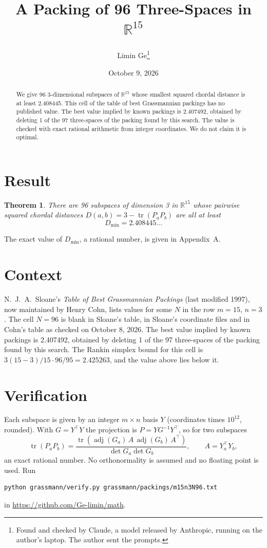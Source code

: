 \documentclass[11pt,a4paper]{article}
\title{A Packing of 96 Three-Spaces in $\mathbb{R}^{15}$}
\author{Limin Ge\thanks{Found and checked by Claude, a model released by Anthropic, running on the author's laptop. The author sent the prompts.}}
\date{October 9, 2026}
\newtheorem*{theorem}{Theorem}
\begin{document}
\maketitle
\begin{abstract}
We give 96 3-dimensional subspaces of $\mathbb{R}^{15}$ whose smallest squared chordal distance is at least 2.408445. This cell of the table of best Grassmannian packings has no published value. The best value implied by known packings is 2.407492, obtained by deleting 1 of the 97 three-spaces of the packing found by this search. The value is checked with exact rational arithmetic from integer coordinates. We do not claim it is optimal.
\end{abstract}

\section{Result}
\begin{theorem}
There are 96 subspaces of dimension 3 in $\mathbb{R}^{15}$ whose pairwise squared chordal distances $D(a,b) = 3 - \operatorname{tr}(P_aP_b)$ are all at least
\[ D_{\min} = 2.408445\ldots \]
\end{theorem}
The exact value of $D_{\min}$, a rational number, is given in Appendix~A.


\section{Context}
N.~J.~A.~Sloane's \emph{Table of Best Grassmannian Packings} (last modified 1997), now maintained by Henry Cohn, lists values for some $N$ in the row $m=15$, $n=3$. The cell $N=96$ is blank in Sloane's table, in Sloane's coordinate files and in Cohn's table as checked on October 8, 2026. The best value implied by known packings is 2.407492, obtained by deleting 1 of the 97 three-spaces of the packing found by this search. The Rankin simplex bound for this cell is $3(15-3)/15\cdot 96/95 = 2.425263$, and the value above lies below it.


\section{Verification}
Each subspace is given by an integer $m\times n$ basis $Y$ (coordinates times $10^{12}$, rounded). With $G=Y^\top Y$ the projection is $P=YG^{-1}Y^\top$, so for two subspaces
\[ \operatorname{tr}(P_aP_b)=\frac{\operatorname{tr}(\operatorname{adj}(G_a)\,A\,\operatorname{adj}(G_b)\,A^\top)}{\det G_a\det G_b},\qquad A=Y_a^\top Y_b, \]
an exact rational number. No orthonormality is assumed and no floating point is used. Run
\begin{verbatim}
python grassmann/verify.py grassmann/packings/m15n3N96.txt
\end{verbatim}
in \url{https://github.com/Ge-limin/math}.
\end{document}
